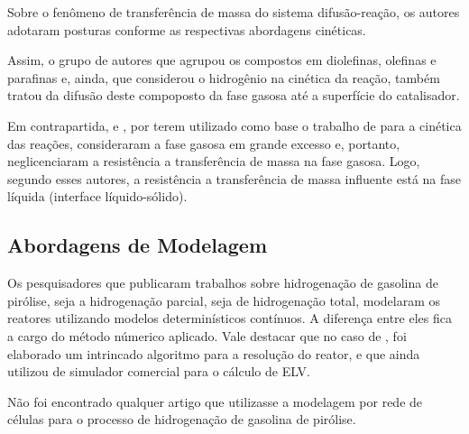 Sobre o fenômeno de transferência de massa do sistema difusão-reação, 
os autores adotaram posturas conforme as respectivas abordagens cinéticas.

Assim, o grupo de autores que agrupou os compostos em diolefinas, olefinas e
parafinas \cite{Arpornwichanop2002, Authayanun2008} e, ainda, que considerou o
hidrogênio na cinética da reação, também tratou da difusão deste compoposto da
fase gasosa até a superfície do catalisador. 

Em contrapartida,  e , por
terem utilizado como base o trabalho de  para a cinética
das reações, consideraram a fase gasosa em grande excesso e, portanto,
neglicenciaram a resistência a transferência de massa na fase gasosa.
Logo, segundo esses autores, a resistência a transferência de massa influente
está na fase líquida (interface líquido-sólido).

\subsection{Abordagens de Modelagem} \label{sec:abordagensmodelagem}

Os pesquisadores que publicaram trabalhos sobre hidrogenação de gasolina
de pirólise, seja a hidrogenação parcial, seja de hidrogenação total, modelaram
os reatores utilizando modelos determinísticos contínuos. A diferença entre
eles fica a cargo do método númerico aplicado. Vale destacar que no caso de
, foi elaborado um intrincado algoritmo para a resolução
do reator, e que ainda utilizou de simulador comercial para o cálculo de ELV.

Não foi encontrado qualquer artigo que utilizasse a modelagem por rede de
células para o processo de hidrogenação de gasolina de pirólise.



